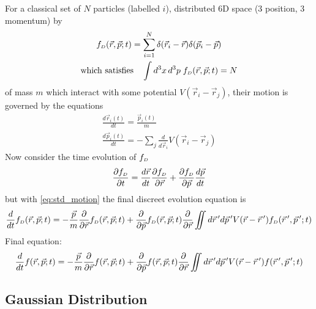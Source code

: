 For a classical set of $N$ particles (labelled $i$), distributed 6D space (3 position, 3 momentum) by 
\begin{gather}
  f_{{\scriptscriptstyle D}}(\vec{r}, \vec{p}; t) = 
  \sum\limits^{N}_{i=1} \delta(\vec{r}_{i} - \vec{r}) \delta(\vec{p}_{i} - \vec{p}) \\
  \text{which satisfies} \quad \int d^{3}x\,d^{3}p \; f_{{\scriptscriptstyle D}}(\vec{r}, \vec{p}; t) = N
\end{gather}
of mass $m$ which interact with some potential $V(\vec{r}_{i} - \vec{r}_{j})$, their motion is governed by the equations
\begin{subequations}\label{eq:std_motion}
\begin{gather}
  \frac{d\vec{r}_{i}(t)}{dt} = \frac{\vec{p}_{i}(t)}{m}\\
  \frac{d\vec{p}_{i}(t)}{dt} = -\sum\limits_{j} \frac{d}{d\vec{r}_{i}} V(\vec{r}_{i} - \vec{r}_{j})
\end{gather}
\end{subequations}
Now consider the time evolution of $f_{{\scriptscriptstyle D}}$
\begin{equation}
  \frac{\partial f_{{\scriptscriptstyle D}}}{\partial t} = 
  \frac{d\vec{r}}{dt} \frac{\partial f_{{\scriptscriptstyle D}}}{\partial \vec{r}} 
  + \frac{\partial f_{{\scriptscriptstyle D}}}{\partial \vec{p}} \frac{d\vec{p}}{dt}
\end{equation}
but with \ref{eq:std_motion} the final discreet evolution equation is
\begin{equation}
  \frac{d}{dt} f_{{\scriptscriptstyle D}}(\vec{r}, \vec{p}; t) =
  -\frac{\vec{p}}{m} \frac{\partial}{\partial \vec{r}} f_{{\scriptscriptstyle D}}(\vec{r}, \vec{p}; t)
  + \frac{\partial}{\partial \vec{p}} f_{{\scriptscriptstyle D}} (\vec{r}, \vec{p}; t)
  \frac{\partial}{\partial \vec{r}} \iint d\vec{r}\,^{\prime} d\vec{p}\,^{\prime} V(\vec{r} - \vec{r}\,^{\prime}) f_{{\scriptscriptstyle D}}(\vec{r}\,^{\prime},\vec{p}\,^{\prime};t)
\end{equation}
Final equation:
\begin{equation} \label{eq:formal_evolution}
  \frac{d}{dt} f(\vec{r}, \vec{p}; t) =
  -\frac{\vec{p}}{m} \frac{\partial}{\partial \vec{r}} f(\vec{r}, \vec{p}; t)
  + \frac{\partial}{\partial \vec{p}} f (\vec{r}, \vec{p}; t)
  \frac{\partial}{\partial \vec{r}} \iint d\vec{r}\,^{\prime} d\vec{p}\,^{\prime} V(\vec{r} - \vec{r}\,^{\prime}) f(\vec{r}\,^{\prime},\vec{p}\,^{\prime};t)
\end{equation}

\subsection{Gaussian Distribution}

